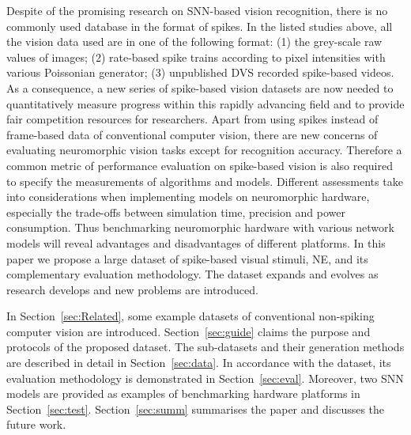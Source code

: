 Despite of the promising research on SNN-based vision recognition, there is no commonly used database in the format of spikes.
In the listed studies above, all the vision data used are in one of the following format:
(1) the grey-scale raw values of images;
(2) rate-based spike trains according to pixel intensities with various Poissonian generator;
(3) unpublished DVS recorded spike-based videos.
As a consequence, a new series of spike-based vision datasets are now needed to quantitatively measure progress within this rapidly advancing field and to provide fair competition resources for researchers.
Apart from using spikes instead of frame-based data of conventional computer vision, there are new concerns of evaluating neuromorphic vision tasks except for recognition accuracy.
Therefore a common metric of performance evaluation on spike-based vision is also required to specify the measurements of algorithms and models. 
Different assessments take into considerations when implementing models on neuromorphic hardware, especially the trade-offs between simulation time, precision and power consumption.
Thus benchmarking neuromorphic hardware with various network models will reveal advantages and disadvantages of different platforms.
In this paper we propose a large dataset of spike-based visual stimuli, NE, and its complementary evaluation methodology.
The dataset expands and evolves as research develops and new problems are introduced.

In Section~\ref{sec:Related}, some example datasets of conventional non-spiking computer vision are introduced.
Section~\ref{sec:guide} claims the purpose and protocols of the proposed dataset.
The sub-datasets and their generation methods are described in detail in Section~\ref{sec:data}.
In accordance with the dataset, its evaluation methodology is demonstrated in Section~\ref{sec:eval}.
Moreover, two SNN models are provided as examples of benchmarking hardware platforms in Section~\ref{sec:test}.
Section~\ref{sec:summ} summarises the paper and discusses the future work.